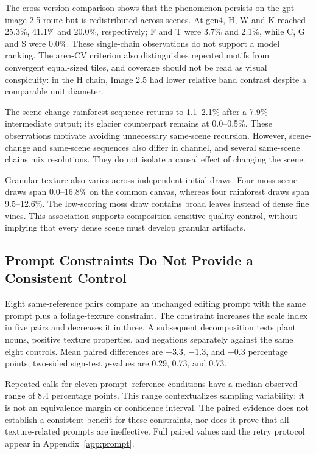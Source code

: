 \documentclass[sigplan,10pt,nonacm]{acmart}
\begin{document}
The cross-version comparison shows that the phenomenon persists on the gpt-image-2.5 route but is redistributed across scenes. At gen4, H, W and K reached 25.3\%, 41.1\% and 20.0\%, respectively; F and T were 3.7\% and 2.1\%, while C, G and S were 0.0\%. These single-chain observations do not support a model ranking. The area-CV criterion also distinguishes repeated motifs from convergent equal-sized tiles, and coverage should not be read as visual conspicuity: in the H chain, Image 2.5 had lower relative band contrast despite a comparable unit diameter.

The scene-change rainforest sequence returns to 1.1--2.1\% after a 7.9\% intermediate output; its glacier counterpart remains at 0.0--0.5\%. These observations motivate avoiding unnecessary same-scene recursion. However, scene-change and same-scene sequences also differ in channel, and several same-scene chains mix resolutions. They do not isolate a causal effect of changing the scene.

Granular texture also varies across independent initial draws. Four moss-scene draws span 0.0--16.8\% on the common canvas, whereas four rainforest draws span 9.5--12.6\%. The low-scoring moss draw contains broad leaves instead of dense fine vines. This association supports composition-sensitive quality control, without implying that every dense scene must develop granular artifacts.

\subsection{Prompt Constraints Do Not Provide a Consistent Control}
Eight same-reference pairs compare an unchanged editing prompt with the same prompt plus a foliage-texture constraint. The constraint increases the scale index in five pairs and decreases it in three. A subsequent decomposition tests plant nouns, positive texture properties, and negations separately against the same eight controls. Mean paired differences are $+3.3$, $-1.3$, and $-0.3$ percentage points; two-sided sign-test $p$-values are 0.29, 0.73, and 0.73.

Repeated calls for eleven prompt--reference conditions have a median observed range of 8.4 percentage points. This range contextualizes sampling variability; it is not an equivalence margin or confidence interval. The paired evidence does not establish a consistent benefit for these constraints, nor does it prove that all texture-related prompts are ineffective. Full paired values and the retry protocol appear in Appendix~\ref{app:prompt}.
\end{document}
